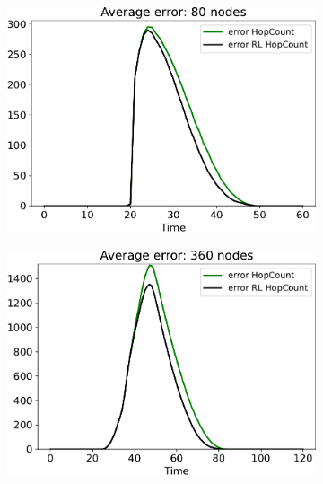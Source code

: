 \documentclass[conference]{IEEEtran}
\begin{document}
\begin{figure}
  \centering
  \begin{subfigure}[b]{0.3\textwidth}
      \centering
      \includegraphics[width=\textwidth]{img/80}
      \caption{}
      \label{fig:simulation-b}
  \end{subfigure}
  \hfill
  \begin{subfigure}[b]{0.3\textwidth}
      \centering
      \includegraphics[width=\textwidth]{img/360}
      \caption{}
      \label{fig:simulation-c}
  \end{subfigure}
  \hfill
  \begin{subfigure}[b]{0.3\textwidth}
      \centering

\end{subfigure}
\end{figure}
\end{document}
